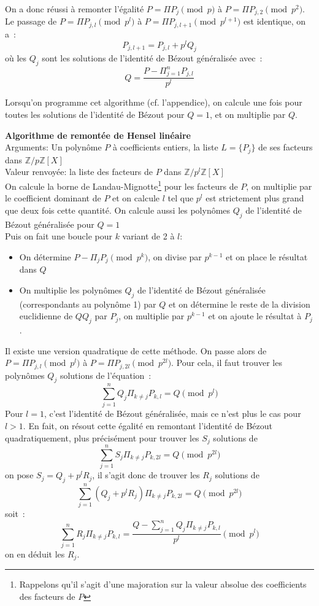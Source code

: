 \documentclass[a4paper,11pt]{article}
\newcommand{\Z}{{\mathbb{Z}}}
\begin{document}
\begin{giacjshere}
On a donc réussi à remonter l'égalité $P=\Pi P_j \pmod p$ à 
$P=\Pi P_{j,2} \pmod {p^2}$. Le passage de $P=\Pi P_{j,l} \pmod {p^l}$
à $P=\Pi P_{j,l+1} \pmod {p^{l+1}}$ est identique, on a~:
\[ P_{j,l+1}=P_{j,l}+p^{l}Q_j \]
où les $Q_j$ sont les solutions de l'identité de Bézout généralisée avec~:
\[ Q=\frac{P-\Pi_{j=1}^n P_{j,l}}{p^l}\]

Lorsqu'on programme cet algorithme (cf. l'appendice), 
on calcule une fois pour toutes les
solutions de l'identité de Bézout pour $Q=1$, et on multiplie par $Q$.

{\bf Algorithme de remontée de Hensel linéaire}\\
Arguments: Un polynôme $P$ à coefficients entiers, la liste $L=\{ P_j \}$ 
de ses facteurs dans $\Z/p\Z[X]$\\
Valeur renvoyée: la liste des facteurs de $P$ dans $\Z/p^l \Z[X]$\\
On calcule la borne de Landau-Mignotte\footnote{Rappelons qu'il s'agit d'une
majoration sur la valeur absolue des coefficients des facteurs de $P$} 
pour les facteurs de $P$, on multiplie
par le coefficient dominant de $P$ et on calcule $l$ tel que $p^l$ est
strictement plus grand que deux fois cette quantité. On calcule
aussi les polynômes $Q_j$ de l'identité de Bézout généralisée pour $Q=1$\\
Puis on fait une boucle pour $k$ variant de 2 à $l$:
\begin{itemize}
\item On détermine $P-\Pi_j P_j \pmod {p^{k}}$, on divise par $p^{k-1}$
et on place le résultat dans $Q$
\item On multiplie les polynômes $Q_j$ de l'identité de Bézout 
généralisée (correspondants au polynôme 1) par $Q$
et on détermine le reste de la division euclidienne de $Q Q_j$ par $P_j$,
on multiplie par $p^{k-1}$ et on ajoute le résultat à $P_j$.
\end{itemize}

Il existe une version quadratique de cette méthode. On passe alors de
$P=\Pi P_{j,l} \pmod {p^l}$ à $P=\Pi P_{j,2l} \pmod {p^{2l}}$. Pour
cela, il faut trouver les polynômes $Q_j$ solutions de l'équation~:
\[ \sum_{j=1}^n Q_j \Pi_{k\neq j} P_{k,l}=Q \pmod {p^l}\]
Pour $l=1$, c'est l'identité de Bézout généralisée, mais ce n'est plus le
cas pour $l>1$. En fait, on résout cette égalité en remontant l'identité
de Bézout quadratiquement, plus précisément pour trouver les $S_j$
solutions de
\[ \sum_{j=1}^n S_j \Pi_{k\neq j} P_{k,2l}=Q \pmod {p^{2l}}\]
on pose $S_j=Q_j+p^l R_j$, il s'agit donc de trouver les $R_j$ solutions de
\[ \sum_{j=1}^n (Q_j+p^l R_j) \Pi_{k\neq j} P_{k,2l}=Q \pmod {p^{2l}}\]
soit~:
\[ \sum_{j=1}^n R_j \Pi_{k\neq j} P_{k,l}
=\frac{Q-\sum_{j=1}^n Q_j \Pi_{k\neq j} P_{k,l} }{p^l} \pmod {p^l}\]
on en déduit les $R_j$.


\end{giacjshere}
\end{document}
